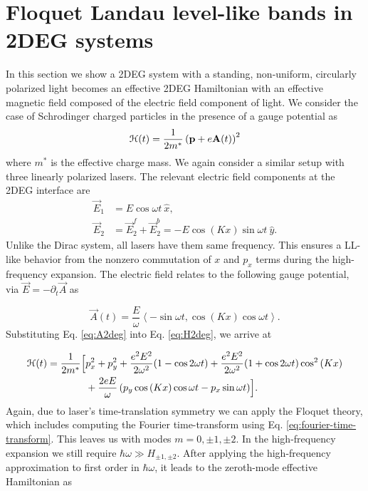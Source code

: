 \section{Floquet Landau level-like bands in 2DEG systems}
In this section we show a 2DEG system with a standing, non-uniform, circularly polarized light becomes an effective 2DEG Hamiltonian with an effective magnetic field composed of the electric field component of light.
We consider the case of Schrodinger charged particles in the presence of a gauge potential as
\begin{equation}\label{eq:H2deg}
  \mathcal{H}(t) = \dfrac{1}{2m^*} \left( \mathbf{p} + e \mathbf{A}(t)\right)^2
\end{equation}
where $m^*$ is the effective charge mass.
We again consider a similar setup with three linearly polarized lasers.
The relevant electric field components at the 2DEG interface are
\begin{align} \label{eq:E2field}
  \vec{E}_{1} &= E \cos{\omega t}\ \hat{x}, \nonumber \\
  \vec{E}_{2} &= \vec{E}_2^f + \vec{E}_2^b = -E\cos{(K x)} \sin{\omega t}\ \hat{y}.
\end{align}%
Unlike the Dirac system, all lasers have them same frequency.
This ensures a LL-like behavior from the nonzero commutation of $x$ and $p_x$ terms during the high-frequency expansion.
The electric field relates to the following gauge potential, via $\vec{E} = -\partial_t \vec{A}$ as

\begin{equation}\label{eq:A2deg}
  \vec{A}(t)= \dfrac{E}{\omega} \left\langle -\sin \omega t, \cos{(Kx)} \cos{\omega t} \right\rangle.
\end{equation}%
Substituting Eq. \eqref{eq:A2deg} into Eq. \eqref{eq:H2deg}, we arrive at

\begin{align}\label{eq:H2time}
  \mathcal{H}(t) = \dfrac{1}{2m^*} \Bigl[ &p_x^2 + p_y^2 + \dfrac{e^2 E^2}{2\omega^2}(1-\cos{2\omega t}) + \dfrac{e^2 E^2}{2\omega^2}(1+\cos{2\omega t}) \cos^2{(Kx)} \nonumber \\
  &+\dfrac{2eE}{\omega} \left(p_y \cos{(Kx)}\cos{\omega t} -  p_x \sin{\omega t}\right) \Bigr].
\end{align}
Again, due to laser's time-translation symmetry we can apply the Floquet theory, which includes computing the Fourier time-transform using Eq. \eqref{eq:fourier-time-transform}.
This leaves us with modes $m=0,\pm1,\pm2$.
In the high-frequency expansion we still require $\hbar \omega \gg H_{\pm1,\pm2}$.
After applying the high-frequency approximation to first order in $\hbar \omega$, it leads to the zeroth-mode effective Hamiltonian as

